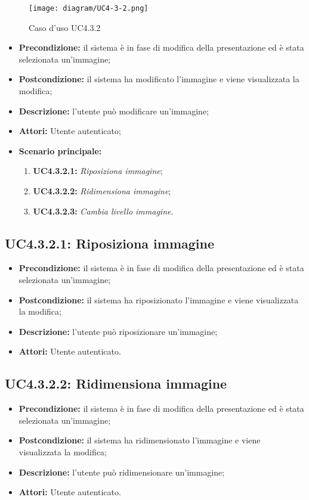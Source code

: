 \begin{figure}[h]
	\begin{center}
	\texttt{[image: diagram/UC4-3-2.png]}
	\caption{Caso d'uso UC4.3.2}
	\end{center}
\end{figure}
\begin{itemize}
	\item \textbf{Precondizione:} il sistema è in fase di modifica della presentazione ed è stata selezionata un'immagine;
	\item \textbf{Postcondizione:} il sistema ha modificato l'immagine e viene visualizzata la modifica;
	\item \textbf{Descrizione:} l'utente può modificare un'immagine;
	\item \textbf{Attori:} Utente autenticato;
	\item \textbf{Scenario principale:}
	\begin{enumerate}
		\item \textbf{ UC4.3.2.1:} \textit{ Riposiziona immagine};
		\item \textbf{ UC4.3.2.2:} \textit{ Ridimensiona immagine};
		\item \textbf{ UC4.3.2.3:} \textit{ Cambia livello immagine}.
	\end{enumerate}
\end{itemize}
\subsection{ UC4.3.2.1: Riposiziona immagine}

\begin{itemize}
	\item \textbf{Precondizione:} il sistema è in fase di modifica della presentazione ed è stata selezionata un'immagine;
	\item \textbf{Postcondizione:} il sistema ha riposizionato l'immagine e viene visualizzata la modifica;
	\item \textbf{Descrizione:} l'utente può riposizionare un'immagine;
	\item \textbf{Attori:} Utente autenticato.
\end{itemize}
\subsection{ UC4.3.2.2: Ridimensiona immagine}

\begin{itemize}
	\item \textbf{Precondizione:} il sistema è in fase di modifica della presentazione ed è stata selezionata un'immagine;
	\item \textbf{Postcondizione:} il sistema ha ridimensionato l'immagine e viene visualizzata la modifica;
	\item \textbf{Descrizione:} l'utente può ridimensionare un'immagine;
	\item \textbf{Attori:} Utente autenticato.
\end{itemize}
